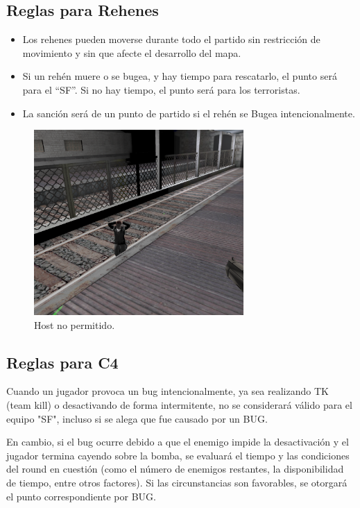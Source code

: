 \documentclass[a4paper, 11pt]{article}
\begin{document}
    \subsection{Reglas para Rehenes}

    \begin{itemize}
        \item Los rehenes pueden moverse durante todo el partido sin restricción de movimiento y sin que afecte el desarrollo del mapa.
        \item Si un rehén muere o se bugea, y hay tiempo para rescatarlo, el punto será para el “SF”. Si no hay tiempo, el punto será para los terroristas.
        \item La sanción será de un punto de partido si el rehén se Bugea intencionalmente.
    \end{itemize}

    
    \begin{figure}[htb]
        \centering
        \includegraphics[width=8cm]{img/host_bug.png}
        \caption{Host no permitido.}
    \end{figure} 

    \subsection{Reglas para C4}

    Cuando un jugador provoca un bug intencionalmente, ya sea realizando TK (team kill) o desactivando de forma intermitente, no se considerará válido para el equipo "SF", incluso si se alega que fue causado por un BUG. 
    
    En cambio, si el bug ocurre debido a que el enemigo impide la desactivación y el jugador termina cayendo sobre la bomba, se evaluará el tiempo y las condiciones del round en cuestión (como el número de enemigos restantes, la disponibilidad de tiempo, entre otros factores). Si las circunstancias son favorables, se otorgará el punto correspondiente por BUG.
\end{document}
